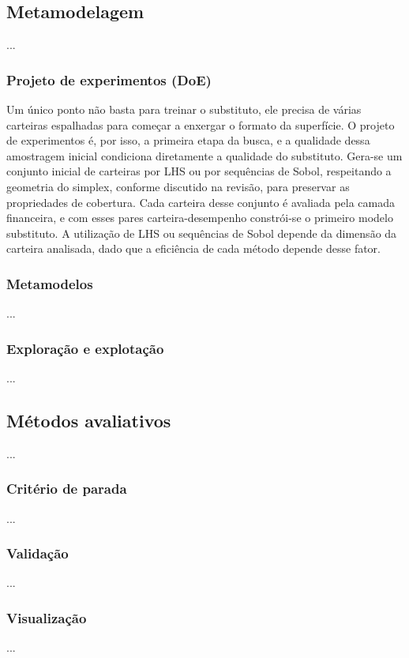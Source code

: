 \documentclass[12pt,a4paper]{article}
\begin{document}
\subsection{Metamodelagem}
...

\subsubsection{Projeto de experimentos (DoE)}

Um único ponto não basta para treinar o substituto, ele precisa de várias carteiras espalhadas para começar a enxergar o formato da superfície. O projeto de experimentos é, por isso, a primeira etapa da busca, e a qualidade dessa amostragem inicial condiciona diretamente a qualidade do substituto. Gera-se um conjunto inicial de carteiras por LHS ou por sequências de Sobol, respeitando a geometria do simplex, conforme discutido na revisão, para preservar as propriedades de cobertura. Cada carteira desse conjunto é avaliada pela camada financeira, e com esses pares carteira-desempenho constrói-se o primeiro modelo substituto. A utilização de LHS ou sequências de Sobol depende da dimensão da carteira analisada, dado que a eficiência de cada método depende desse fator.

\subsubsection{Metamodelos}
...

\subsubsection{Exploração e explotação}
...

\subsection{Métodos avaliativos}
...

\subsubsection{Critério de parada}
...
\subsubsection{Validação}
...
\subsubsection{Visualização}
...

\newpage

\end{document}
